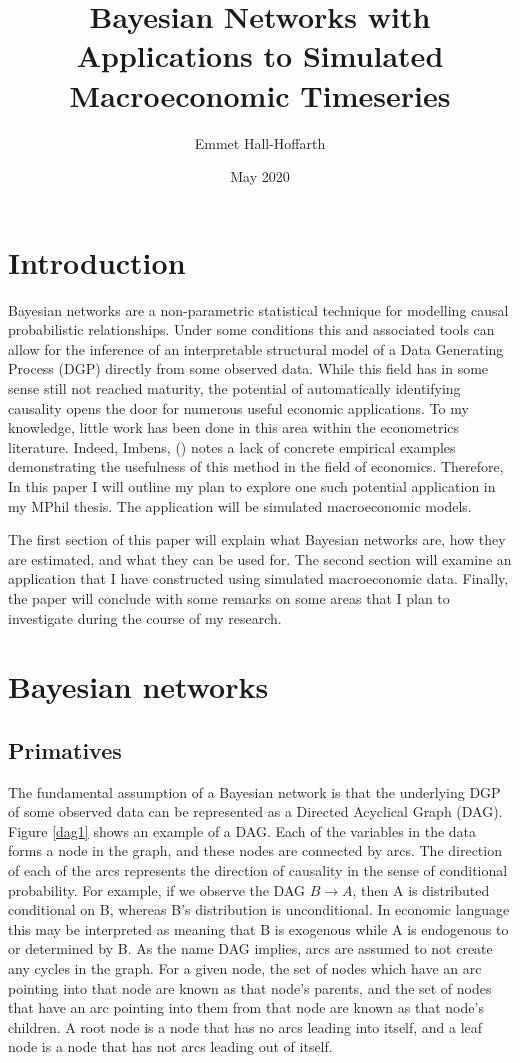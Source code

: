 \documentclass{article}
\title{Bayesian Networks with Applications to Simulated Macroeconomic Timeseries}
\author{Emmet Hall-Hoffarth}
\date{May 2020}
\begin{document}
\maketitle

\section{Introduction}
Bayesian networks \parencite{pearl2018book} \parencite{pearl2014probabilistic} are a non-parametric statistical technique for modelling causal probabilistic relationships. Under some conditions this and associated tools can allow for the inference of an interpretable structural model of a Data Generating Process (DGP) directly from some observed data. While this field has in some sense still not reached maturity, the potential of automatically identifying causality opens the door for numerous useful economic applications. To my knowledge, little work has been done in this area within the econometrics literature. Indeed, Imbens, (\citeyear{imbens2019potential}) notes a lack of concrete empirical examples demonstrating the usefulness of this method in the field of economics. Therefore, In this paper I will outline my plan to explore one such potential application in my MPhil thesis. The application will be simulated macroeconomic models.

The first section of this paper will explain what Bayesian networks are, how they are estimated, and what they can be used for. The second section will examine an application that I have constructed using simulated macroeconomic data. Finally, the paper will conclude with some remarks on some areas that I plan to investigate during the course of my research. 

\section{Bayesian networks}

\subsection{Primatives} \label{prim}

The fundamental assumption of a Bayesian network is that the underlying DGP of some observed data can be represented as a Directed Acyclical Graph (DAG). Figure \ref{dag1} shows an example of a DAG. Each of the variables in the data forms a node in the graph, and these nodes are connected by arcs. The direction of each of the arcs represents the direction of causality in the sense of conditional probability. For example, if we observe the DAG $B \rightarrow A$, then A is distributed conditional on B, whereas B's distribution is unconditional. In economic language this may be interpreted as meaning that B is exogenous while A is endogenous to or determined by B. As the name DAG implies, arcs are assumed to not create any cycles in the graph. For a given node, the set of nodes which have an arc pointing into that node are known as that node's parents, and the set of nodes that have an arc pointing into them from that node are known as that node's children. A root node is a node that has no arcs leading into itself, and a leaf node is a node that has not arcs leading out of itself.
\end{document}
